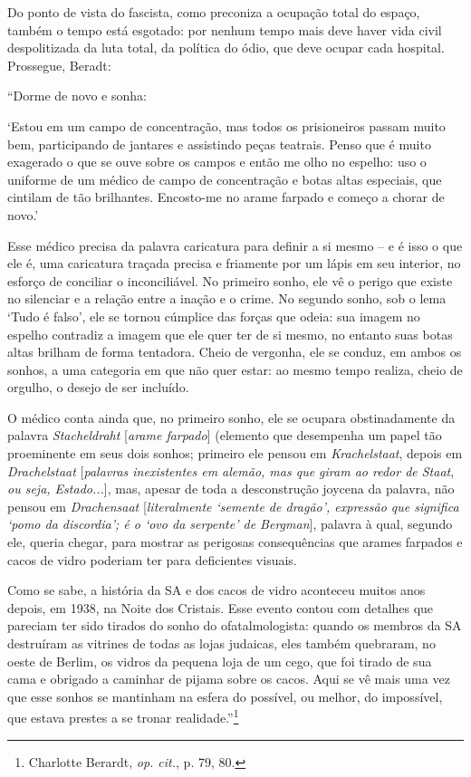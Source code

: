 Do ponto de vista do fascista, como preconiza a ocupação total do
espaço, também o tempo está esgotado: por nenhum tempo mais deve haver
vida civil despolitizada da luta total, da política do ódio, que deve
ocupar cada hospital. Prossegue, Beradt:

``Dorme de novo e sonha:

`Estou em um campo de concentração, mas todos os prisioneiros passam
muito bem, participando de jantares e assistindo peças teatrais. Penso
que é muito exagerado o que se ouve sobre os campos e então me olho no
espelho: uso o uniforme de um médico de campo de concentração e botas
altas especiais, que cintilam de tão brilhantes. Encosto-me no arame
farpado e começo a chorar de novo.'

Esse médico precisa da palavra caricatura para definir a si mesmo -- e é
isso o que ele é, uma caricatura traçada precisa e friamente por um
lápis em seu interior, no esforço de conciliar o inconciliável. No
primeiro sonho, ele vê o perigo que existe no silenciar e a relação
entre a inação e o crime. No segundo sonho, sob o lema `Tudo é falso',
ele se tornou cúmplice das forças que odeia: sua imagem no espelho
contradiz a imagem que ele quer ter de si mesmo, no entanto suas botas
altas brilham de forma tentadora. Cheio de vergonha, ele se conduz, em
ambos os sonhos, a uma categoria em que não quer estar: ao mesmo tempo
realiza, cheio de orgulho, o desejo de ser incluído.

O médico conta ainda que, no primeiro sonho, ele se ocupara
obstinadamente da palavra \emph{Stacheldraht} {[}\emph{arame farpado}{]}
(elemento que desempenha um papel tão proeminente em seus dois sonhos;
primeiro ele pensou em \emph{Krachelstaat}, depois em
\emph{Drachelstaat} {[}\emph{palavras inexistentes em alemão, mas que
giram ao redor de Staat}, \emph{ou seja, Estado...}{]}, mas, apesar de
toda a desconstrução joycena da palavra, não pensou em
\emph{Drachensaat} {[}\emph{literalmente `semente de dragão', expressão
que significa `pomo da discordia'; é o `ovo da serpente' de Bergman}{]},
palavra à qual, segundo ele, queria chegar, para mostrar as perigosas
consequências que arames farpados e cacos de vidro poderiam ter para
deficientes visuais.

Como se sabe, a história da SA e dos cacos de vidro aconteceu muitos
anos depois, em 1938, na Noite dos Cristais. Esse evento contou com
detalhes que pareciam ter sido tirados do sonho do ofatalmologista:
quando os membros da SA destruíram as vitrines de todas as lojas
judaicas, eles também quebraram, no oeste de Berlim, os vidros da
pequena loja de um cego, que foi tirado de sua cama e obrigado a
caminhar de pijama sobre os cacos. Aqui se vê mais uma vez que esse
sonhos se mantinham na esfera do possível, ou melhor, do impossível, que
estava prestes a se tronar realidade.''\footnote{Charlotte Berardt,
  \emph{op. cit.}, p. 79, 80.}

